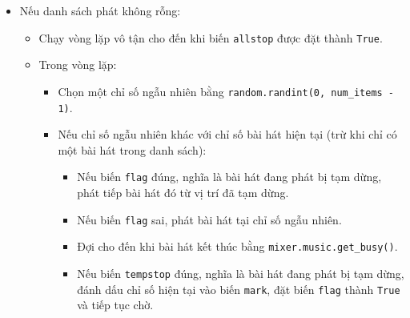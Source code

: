 \documentclass[a4paper]{article}
\begin{document}
\begin{enumerate}
\begin{itemize}
    \item Nếu danh sách phát không rỗng:
        \begin{itemize}
            \item Chạy vòng lặp vô tận cho đến khi biến \texttt{allstop} được đặt thành \texttt{True}.
            \item Trong vòng lặp:
                \begin{itemize}
                    \item Chọn một chỉ số ngẫu nhiên bằng \texttt{random.randint(0, num\_items - 1)}.
                    \item Nếu chỉ số ngẫu nhiên khác với chỉ số bài hát hiện tại (trừ khi chỉ có một bài hát trong danh sách):
                        \begin{itemize}
                            \item Nếu biến \texttt{flag} đúng, nghĩa là bài hát đang phát bị tạm dừng, phát tiếp bài hát đó từ vị trí đã tạm dừng.
                            \item Nếu biến \texttt{flag} sai, phát bài hát tại chỉ số ngẫu nhiên.
                            \item Đợi cho đến khi bài hát kết thúc bằng \texttt{mixer.music.get\_busy()}.
                            \item Nếu biến \texttt{tempstop} đúng, nghĩa là bài hát đang phát bị tạm dừng, đánh dấu chỉ số hiện tại vào biến \texttt{mark}, đặt biến \texttt{flag} thành \texttt{True} và tiếp tục chờ.
                        \end{itemize}
                \end{itemize}
        \end{itemize}
\end{itemize}


\end{enumerate}
\end{document}
